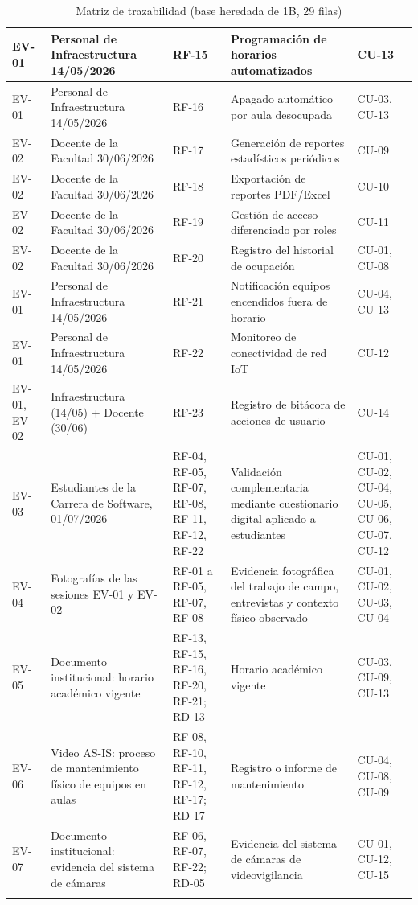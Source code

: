 \begin{longtable}{|p{3.1cm}|p{3.1cm}|p{3.1cm}|p{3.1cm}|p{3.1cm}|}
EV-01 & Personal de Infraestructura 14/05/2026 & RF-15 & Programación de horarios automatizados & CU-13 \\ \hline
EV-01 & Personal de Infraestructura 14/05/2026 & RF-16 & Apagado automático por aula desocupada & CU-03, CU-13 \\ \hline
EV-02 & Docente de la Facultad 30/06/2026 & RF-17 & Generación de reportes estadísticos periódicos & CU-09 \\ \hline
EV-02 & Docente de la Facultad 30/06/2026 & RF-18 & Exportación de reportes PDF/Excel & CU-10 \\ \hline
EV-02 & Docente de la Facultad 30/06/2026 & RF-19 & Gestión de acceso diferenciado por roles & CU-11 \\ \hline
EV-02 & Docente de la Facultad 30/06/2026 & RF-20 & Registro del historial de ocupación & CU-01, CU-08 \\ \hline
EV-01 & Personal de Infraestructura 14/05/2026 & RF-21 & Notificación equipos encendidos fuera de horario & CU-04, CU-13 \\ \hline
EV-01 & Personal de Infraestructura 14/05/2026 & RF-22 & Monitoreo de conectividad de red IoT & CU-12 \\ \hline
EV-01, EV-02 & Infraestructura (14/05) + Docente (30/06) & RF-23 & Registro de bitácora de acciones de usuario & CU-14 \\ \hline
EV-03 & Estudiantes de la Carrera de Software, 01/07/2026 & RF-04, RF-05, RF-07, RF-08, RF-11, RF-12, RF-22 & Validación complementaria mediante cuestionario digital aplicado a estudiantes & CU-01, CU-02, CU-04, CU-05, CU-06, CU-07, CU-12 \\ \hline
EV-04 & Fotografías de las sesiones EV-01 y EV-02 & RF-01 a RF-05, RF-07, RF-08 & Evidencia fotográfica del trabajo de campo, entrevistas y contexto físico observado & CU-01, CU-02, CU-03, CU-04 \\ \hline
EV-05 & Documento institucional: horario académico vigente & RF-13, RF-15, RF-16, RF-20, RF-21; RD-13 & Horario académico vigente & CU-03, CU-09, CU-13 \\ \hline
EV-06 & Video AS-IS: proceso de mantenimiento físico de equipos en aulas & RF-08, RF-10, RF-11, RF-12, RF-17; RD-17 & Registro o informe de mantenimiento & CU-04, CU-08, CU-09 \\ \hline
EV-07 & Documento institucional: evidencia del sistema de cámaras & RF-06, RF-07, RF-22; RD-05 & Evidencia del sistema de cámaras de videovigilancia & CU-01, CU-12, CU-15 \\ \hline
\caption{Matriz de trazabilidad (base heredada de 1B, 29 filas)}
\end{longtable}
\endgroup

